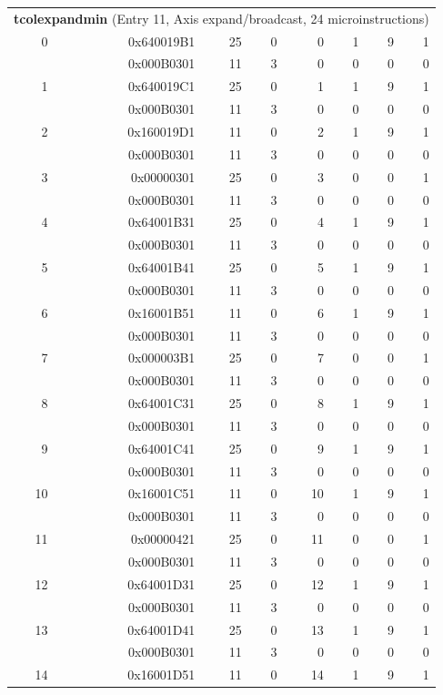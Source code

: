 \begin{longtable}{r r r r r r r r}
\multicolumn{8}{l}{\textbf{tcolexpandmin} (Entry 11, Axis expand/broadcast, 24 microinstructions)} \\
0 & 0x640019B1 & 25 & 0 & 0 & 1 & 9 & 1 \\
  & 0x000B0301 & 11 & 3 & 0 & 0 & 0 & 0 \\
1 & 0x640019C1 & 25 & 0 & 1 & 1 & 9 & 1 \\
  & 0x000B0301 & 11 & 3 & 0 & 0 & 0 & 0 \\
2 & 0x160019D1 & 11 & 0 & 2 & 1 & 9 & 1 \\
  & 0x000B0301 & 11 & 3 & 0 & 0 & 0 & 0 \\
3 & 0x00000301 & 25 & 0 & 3 & 0 & 0 & 1 \\
  & 0x000B0301 & 11 & 3 & 0 & 0 & 0 & 0 \\
4 & 0x64001B31 & 25 & 0 & 4 & 1 & 9 & 1 \\
  & 0x000B0301 & 11 & 3 & 0 & 0 & 0 & 0 \\
5 & 0x64001B41 & 25 & 0 & 5 & 1 & 9 & 1 \\
  & 0x000B0301 & 11 & 3 & 0 & 0 & 0 & 0 \\
6 & 0x16001B51 & 11 & 0 & 6 & 1 & 9 & 1 \\
  & 0x000B0301 & 11 & 3 & 0 & 0 & 0 & 0 \\
7 & 0x000003B1 & 25 & 0 & 7 & 0 & 0 & 1 \\
  & 0x000B0301 & 11 & 3 & 0 & 0 & 0 & 0 \\
8 & 0x64001C31 & 25 & 0 & 8 & 1 & 9 & 1 \\
  & 0x000B0301 & 11 & 3 & 0 & 0 & 0 & 0 \\
9 & 0x64001C41 & 25 & 0 & 9 & 1 & 9 & 1 \\
  & 0x000B0301 & 11 & 3 & 0 & 0 & 0 & 0 \\
10 & 0x16001C51 & 11 & 0 & 10 & 1 & 9 & 1 \\
  & 0x000B0301 & 11 & 3 & 0 & 0 & 0 & 0 \\
11 & 0x00000421 & 25 & 0 & 11 & 0 & 0 & 1 \\
  & 0x000B0301 & 11 & 3 & 0 & 0 & 0 & 0 \\
12 & 0x64001D31 & 25 & 0 & 12 & 1 & 9 & 1 \\
  & 0x000B0301 & 11 & 3 & 0 & 0 & 0 & 0 \\
13 & 0x64001D41 & 25 & 0 & 13 & 1 & 9 & 1 \\
  & 0x000B0301 & 11 & 3 & 0 & 0 & 0 & 0 \\
14 & 0x16001D51 & 11 & 0 & 14 & 1 & 9 & 1 \\

\end{longtable}
